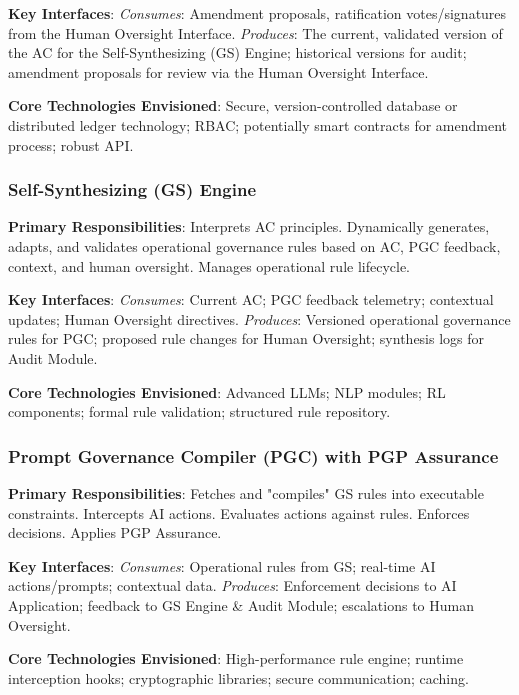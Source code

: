 \documentclass[sigconf,review,anonymous=false]{acmart} %
\begin{document}
\textbf{Key Interfaces}:
    \textit{Consumes}: Amendment proposals, ratification votes/signatures from the Human Oversight Interface.
    \textit{Produces}: The current, validated version of the AC for the Self-Synthesizing (GS) Engine; historical versions for audit; amendment proposals for review via the Human Oversight Interface.

\textbf{Core Technologies Envisioned}: Secure, version-controlled database or distributed ledger technology; RBAC; potentially smart contracts for amendment process; robust API.

\subsubsection{Self-Synthesizing (GS) Engine}
\label{app:architecture_details_gs_engine}
\textbf{Primary Responsibilities}: Interprets AC principles. Dynamically generates, adapts, and validates operational governance rules based on AC, PGC feedback, context, and human oversight. Manages operational rule lifecycle.

\textbf{Key Interfaces}:
    \textit{Consumes}: Current AC; PGC feedback telemetry; contextual updates; Human Oversight directives.
    \textit{Produces}: Versioned operational governance rules for PGC; proposed rule changes for Human Oversight; synthesis logs for Audit Module.

\textbf{Core Technologies Envisioned}: Advanced LLMs; NLP modules; RL components; formal rule validation; structured rule repository.

\subsubsection{Prompt Governance Compiler (PGC) with PGP Assurance}
\label{app:architecture_details_pgc}
\textbf{Primary Responsibilities}: Fetches and "compiles" GS rules into executable constraints. Intercepts AI actions. Evaluates actions against rules. Enforces decisions. Applies PGP Assurance.

\textbf{Key Interfaces}:
    \textit{Consumes}: Operational rules from GS; real-time AI actions/prompts; contextual data.
    \textit{Produces}: Enforcement decisions to AI Application; feedback to GS Engine \& Audit Module; escalations to Human Oversight.

\textbf{Core Technologies Envisioned}: High-performance rule engine; runtime interception hooks; cryptographic libraries; secure communication; caching.
\end{document}
